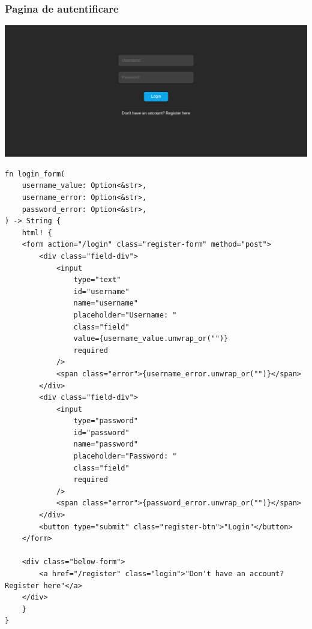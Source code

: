 \vspace{3cm}
\subsubsection{Pagina de autentificare}

\vspace{1cm}
\begin{center}
	\includegraphics[width=15cm]{3/frontend/login.png}
\end{center}
\vspace{1cm}

\begin{lstlisting}[language=RustHtml]
fn login_form(
    username_value: Option<&str>,
    username_error: Option<&str>,
    password_error: Option<&str>,
) -> String {
    html! {
    <form action="/login" class="register-form" method="post">
        <div class="field-div">
            <input
                type="text"
                id="username"
                name="username"
                placeholder="Username: "
                class="field"
                value={username_value.unwrap_or("")}
                required
            />
            <span class="error">{username_error.unwrap_or("")}</span>
        </div>
        <div class="field-div">
            <input
                type="password"
                id="password"
                name="password"
                placeholder="Password: "
                class="field"
                required
            />
            <span class="error">{password_error.unwrap_or("")}</span>
        </div>
        <button type="submit" class="register-btn">"Login"</button>
    </form>

    <div class="below-form">
        <a href="/register" class="login">"Don't have an account? Register here"</a>
    </div>
    }
}
\end{lstlisting}

